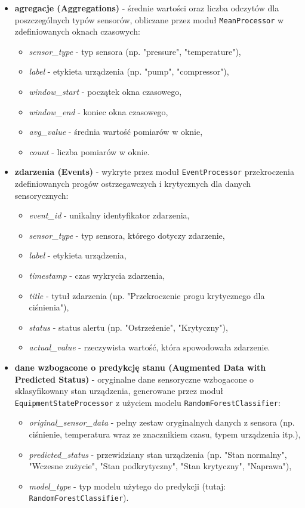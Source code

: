 \begin{itemize}
    \item \textbf{agregacje (Aggregations)} - średnie wartości oraz liczba odczytów dla poszczególnych typów sensorów, obliczane przez moduł \texttt{MeanProcessor} w zdefiniowanych oknach czasowych:
    \begin{itemize}
        \item \textit{sensor\_type} - typ sensora (np. "pressure", "temperature"),
        \item \textit{label} - etykieta urządzenia (np. "pump", "compressor"),
        \item \textit{window\_start} - początek okna czasowego,
        \item \textit{window\_end} - koniec okna czasowego,
        \item \textit{avg\_value} - średnia wartość pomiarów w oknie,
        \item \textit{count} - liczba pomiarów w oknie.
    \end{itemize}
    
    \item \textbf{zdarzenia (Events)} - wykryte przez moduł \texttt{EventProcessor} przekroczenia zdefiniowanych progów ostrzegawczych i krytycznych dla danych sensorycznych:
    \begin{itemize}
        \item \textit{event\_id} - unikalny identyfikator zdarzenia,
        \item \textit{sensor\_type} - typ sensora, którego dotyczy zdarzenie,
        \item \textit{label} - etykieta urządzenia,
        \item \textit{timestamp} - czas wykrycia zdarzenia,
        \item \textit{title} - tytuł zdarzenia (np. "Przekroczenie progu krytycznego dla ciśnienia"),
        \item \textit{status} - status alertu (np. "Ostrzeżenie", "Krytyczny"),
        \item \textit{actual\_value} - rzeczywista wartość, która spowodowała zdarzenie.
    \end{itemize}
    
    \item \textbf{dane wzbogacone o predykcję stanu (Augmented Data with Predicted Status)} - oryginalne dane sensoryczne wzbogacone o sklasyfikowany stan urządzenia, generowane przez moduł \texttt{EquipmentStateProcessor} z użyciem modelu \texttt{RandomForestClassifier}:
    \begin{itemize}
        \item \textit{original\_sensor\_data} - pełny zestaw oryginalnych danych z sensora (np. ciśnienie, temperatura wraz ze znacznikiem czasu, typem urządzenia itp.),
        \item \textit{predicted\_status} - przewidziany stan urządzenia (np. "Stan normalny", "Wczesne zużycie", "Stan podkrytyczny", "Stan krytyczny", "Naprawa"),
        \item \textit{model\_type} - typ modelu użytego do predykcji (tutaj: \texttt{RandomForestClassifier}).
    \end{itemize}
\end{itemize}

